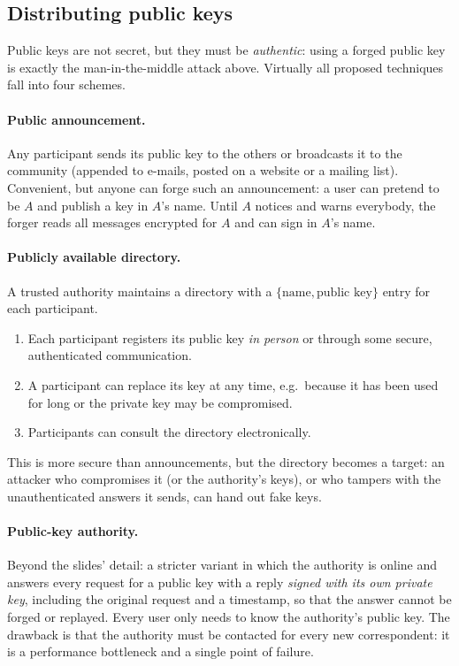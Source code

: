 \subsection{Distributing public keys}

Public keys are not secret, but they must be \emph{authentic}: using a forged public key is exactly the man-in-the-middle attack above. Virtually all proposed techniques fall into four schemes.

\paragraph{Public announcement.} Any participant sends its public key to the others or broadcasts it to the community (appended to e-mails, posted on a website or a mailing list). Convenient, but anyone can forge such an announcement: a user can pretend to be $A$ and publish a key in $A$'s name. Until $A$ notices and warns everybody, the forger reads all messages encrypted for $A$ and can sign in $A$'s name.

\paragraph{Publicly available directory.} A trusted authority maintains a directory with a $\{\text{name}, \text{public key}\}$ entry for each participant.
\begin{enumerate}
    \item Each participant registers its public key \emph{in person} or through some secure, authenticated communication.
    \item A participant can replace its key at any time, e.g.\ because it has been used for long or the private key may be compromised.
    \item Participants can consult the directory electronically.
\end{enumerate}
This is more secure than announcements, but the directory becomes a target: an attacker who compromises it (or the authority's keys), or who tampers with the unauthenticated answers it sends, can hand out fake keys.

\paragraph{Public-key authority.} Beyond the slides' detail: a stricter variant in which the authority is online and answers every request for a public key with a reply \emph{signed with its own private key}, including the original request and a timestamp, so that the answer cannot be forged or replayed. Every user only needs to know the authority's public key. The drawback is that the authority must be contacted for every new correspondent: it is a performance bottleneck and a single point of failure.

